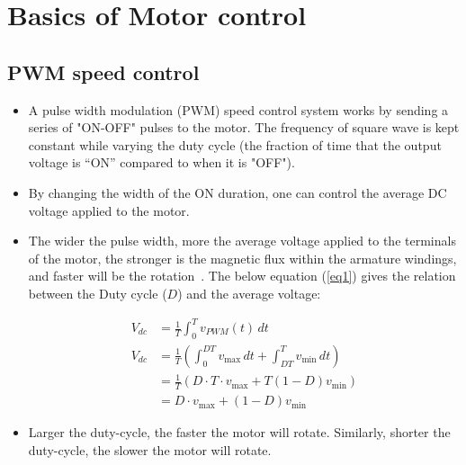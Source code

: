 \chapter{Basics of Motor control} \label{Basics_motor_control}

\section{PWM speed control}
\begin{itemize}
    \item A pulse width modulation (PWM) speed control system works by sending a series of "ON-OFF" pulses to the motor. The frequency of square wave is kept constant while varying the duty cycle (the fraction of time that the output voltage is “ON” compared to when it is "OFF").
    \item By changing the width of the ON duration, one can control the average DC voltage applied to the motor. 
    \item The wider the pulse width,  more the average voltage applied to the terminals of the motor, the stronger is the magnetic flux within the armature windings, and faster will be the rotation~\cite{PWM_control}. The below equation (\ref{eq1}) gives the relation between the Duty cycle ($D$) and the average voltage:

\begin{align}
V_{dc}&={\frac {1}{T}}\int _{0}^{T}v_{PWM}(t)\,dt  \label{eq1} \\
V_{dc} &= {\frac {1}{T}}\left(\int _{0}^{DT}v_{\text{max}}\,dt+\int _{DT}^{T}v_{\text{min}}\,dt\right) \nonumber \\ \nonumber
&={\frac {1}{T}}\left(D\cdot T\cdot v_{\text{max}}+T\left(1-D\right)v_{\text{min}}\right)\\ \nonumber
&=D\cdot v_{\text{max}}+\left(1-D\right)v_{\text{min}} 
\end{align}

    \item Larger the duty-cycle, the faster the motor will rotate. Similarly, shorter the duty-cycle, the slower the motor will rotate.
\end{itemize}

